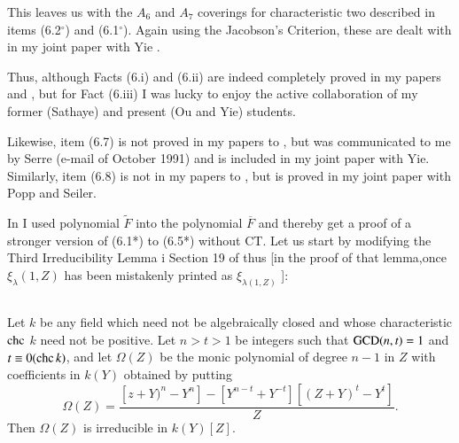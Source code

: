 This leaves us with the $A_{6}$ and $A_{7}$ coverings for characteristic two described in items (6.2$^\circ$) and (6.1$^\circ$). Again using the Jacobson's Criterion, these are dealt with in my joint paper with Yie \cite{art1-key17}.

Thus, although Facts (6.i) and (6.ii) are indeed completely proved in my papers \cite{art1-key8} and \cite{art1-key10}, but for Fact (6.iii) I was lucky to enjoy the active collaboration of my former (Sathaye) and present (Ou and Yie) students.

Likewise, item (6.7) is not proved in my papers \cite{art1-key8} to \cite{art1-key10}, but was communicated to me by Serre (e-mail of October 1991) and is included in my joint paper \cite{art1-key17} with Yie. Similarly, item (6.8) is not in my papers \cite{art1-key8} to \cite{art1-key10}, but is proved in my joint paper \cite{art1-key15} with Popp and Seiler.

\medskip
In \cite{art1-key8} I used polynomial $\widetilde{F}$ into the polynomial  $\overline{F}$ and thereby get a proof of a stronger version of (6.1*) to (6.5*) without CT. Let us start by modifying the Third Irreducibility Lemma i Section 19 of \cite{art1-key8} thus [in the proof of that lemma,once $\xi_{\lambda}(1, Z)$ has been mistakenly printed as $\xi_{\lambda(1, Z)}$ ]:

\subsection{}

Let $k$ be any field which need not be algebraically closed and whose characteristic $\operatorname{chc}$ $k$ need not be positive. Let $n > t > 1$ be integers such that $\operatorname{GCD}(n,t)=1$ and $t\equiv 0(\operatorname{chc} k)$, and let $\Omega(Z)$ be the monic polynomial of degree $n-1$ in $Z$ with coefficients in $k(Y)$ obtained by putting
$$
\Omega(Z)= \dfrac{\left[z+Y)^{n}-Y^{n}\right]-\left[Y^{n-t}+Y^{-t}\right]\left[(Z+Y)^{t}-Y^{t}\right]}{Z}.   
$$
Then $\Omega(Z)$ is irreducible in $k(Y)[Z]$.

